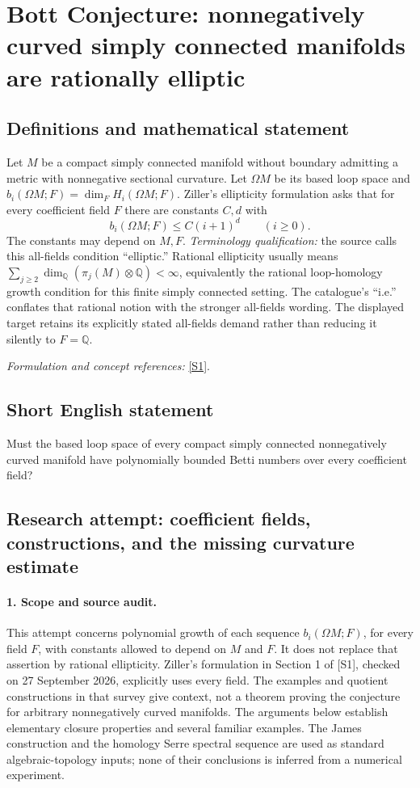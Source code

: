 \documentclass[11pt]{article}
\begin{document}
\section*{\texorpdfstring{Bott Conjecture: nonnegatively curved simply connected manifolds are rationally elliptic}{Bott Conjecture: nonnegatively curved simply connected manifolds are rationally elliptic}}\label{statement}
\subsection{Definitions and mathematical statement}
Let $M$ be a compact simply connected manifold without boundary admitting a metric with nonnegative sectional curvature. Let $\Omega M$ be its based loop space and $b_i(\Omega M;F)=\dim_F H_i(\Omega M;F)$. Ziller's ellipticity formulation asks that for every coefficient field $F$ there are constants $C,d$ with
\[
 b_i(\Omega M;F)\le C(i+1)^d\qquad(i\ge0).
\]
The constants may depend on $M,F$. \emph{Terminology qualification:} the source calls this all-fields condition ``elliptic.'' Rational ellipticity usually means $\sum_{j\ge2}\dim_{{\mathbb{Q}}}(\pi_j(M)\otimes{\mathbb{Q}})<\infty$, equivalently the rational loop-homology growth condition for this finite simply connected setting. The catalogue's ``i.e.'' conflates that rational notion with the stronger all-fields wording. The displayed target retains its explicitly stated all-fields demand rather than reducing it silently to $F={\mathbb{Q}}$.
\par\smallskip\textit{Formulation and concept references:} \href{https://arxiv.org/html/math/0701389v3}{[S1]}.

\subsection{Short English statement}
Must the based loop space of every compact simply connected nonnegatively curved manifold have polynomially bounded Betti numbers over every coefficient field?
\subsection{Research attempt: coefficient fields, constructions, and the missing curvature estimate}
\paragraph{1. Scope and source audit.}
This attempt concerns polynomial growth of each sequence $b_i(\Omega M;F)$, for every field $F$, with constants allowed to depend on $M$ and $F$. It does not replace that assertion by rational ellipticity. Ziller's formulation in Section 1 of [S1], checked on 27 September 2026, explicitly uses every field. The examples and quotient constructions in that survey give context, not a theorem proving the conjecture for arbitrary nonnegatively curved manifolds. The arguments below establish elementary closure properties and several familiar examples. The James construction and the homology Serre spectral sequence are used as standard algebraic-topology inputs; none of their conclusions is inferred from a numerical experiment.
\end{document}
